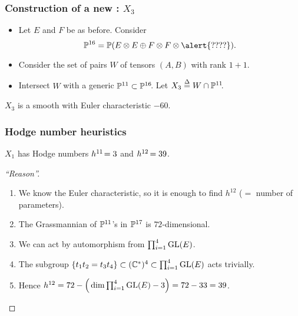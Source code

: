 \begin{frame}
    \frametitle{Construction of a new \CY: $X_3$}

    \begin{itemize}
    	\item
    	Let $E$ and $F$ be as before. Consider
        \[
            \P^{16} = \P(E \otimes E \oplus F \otimes F \otimes\alert{????}).
        \]
        
        \item
        Consider the set of pairs $W$ of tensors $(A, B)$ with rank $1 + 1$.

        \item
        Intersect $W$ with a generic $\P^{11} \subset \P^{16}\mkern-4mu$. Let $X_3 \defeq  W \cap \P^{11}\mkern-4mu$.
    \end{itemize}

    \begin{theorem}
        $X_3$ is a smooth \CY with Euler characteristic $-60$.
    \end{theorem}
\end{frame}

\begin{frame}
    \frametitle{Hodge number heuristics}

    \begin{conjecture}
        $X_1$ has Hodge numbers $h^{11}\mkern-3mu = 3$ and $h^{12}\mkern-2mu = 39$.
    \end{conjecture}

    \begin{proof}[``Reason'']
        \begin{enumerate}[<+->]
            \item
	        We know the Euler characteristic, so it is enough to find $h^{12}$ ($=$ number of parameters).

            \item
            The Grassmannian of $\P^{11}$'s in $\P^{17}$ is $72$-dimensional.

            \item
            We can act by automorphism from $\prod_{i = 1}^4 \GL(E)$.

            \item
            The subgroup $\{ t_1t_2 = t_3t_4 \} \subset (\C^\ast)^4 \subset \prod_{i = 1}^4 \GL(E)$ acts trivially.
            \vspace*{-0.5ex}

            \item
            Hence $h^{12} = 72 - \Big(\dim \prod_{i = 1}^4 \GL(E) - 3\Big) = 72-33 = 39$.
            \qedhere
        \end{enumerate}
    \end{proof}
\end{frame}